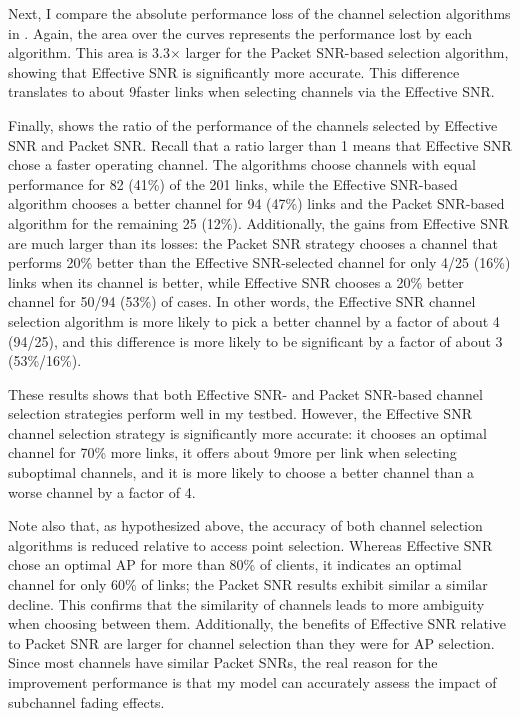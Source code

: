 Next, I compare the absolute performance loss of the channel selection algorithms in . Again, the area over the curves represents the performance lost by each algorithm. This area is 3.3$\times$ larger for the Packet SNR-based selection algorithm, showing that Effective SNR is significantly more accurate. This difference translates to about 9\Mbps faster links when selecting channels via the Effective SNR.

Finally,  shows the ratio of the performance of the channels selected by Effective SNR and Packet SNR. Recall that a ratio larger than 1 means that Effective SNR chose a faster operating channel. The algorithms choose channels with equal performance for 82 (41\%) of the 201 links, while the Effective SNR-based algorithm chooses a better channel for 94 (47\%) links and the Packet SNR-based algorithm for the remaining 25 (12\%). Additionally, the gains from Effective SNR are much larger than its losses: the Packet SNR strategy chooses a channel that performs 20\% better than the Effective SNR-selected channel for only 4/25 (16\%) links when its channel is better, while Effective SNR chooses a 20\% better channel for 50/94 (53\%) of cases. In other words, the Effective SNR channel selection algorithm is more likely to pick a better channel by a factor of about 4 (94/25), and this difference is more likely to be significant by a factor of about 3 (53\%/16\%).

These results shows that both Effective SNR- and Packet SNR-based channel selection strategies perform well in my testbed. However, the Effective SNR channel selection strategy is significantly more accurate: it chooses an optimal channel for 70\% more links, it offers about 9\Mbps more per link when selecting suboptimal channels, and it is more likely to choose a better channel than a worse channel by a factor of 4.

Note also that, as hypothesized above, the accuracy of both channel selection algorithms is reduced relative to access point selection. Whereas Effective SNR chose an optimal AP for more than 80\% of clients, it indicates an optimal channel for only 60\% of links; the Packet SNR results exhibit similar a similar decline. This confirms that the similarity of channels leads to more ambiguity when choosing between them. Additionally, the benefits of Effective SNR relative to Packet SNR are larger for channel selection than they were for AP selection. Since most channels have similar Packet SNRs, the real reason for the improvement performance is that my model can accurately assess the impact of subchannel fading effects.


